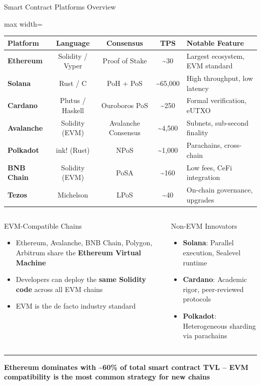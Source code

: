 \documentclass[8pt,aspectratio=169]{beamer}
\newcommand{\bottomnote}[1]{\vfill\vspace{-2mm}\textcolor{mllavender2}{\rule{\textwidth}{0.4pt}}\vspace{1mm}\footnotesize\textbf{#1}}
\begin{document}
\begin{frame}{Smart Contract Platforms Overview}
\centering
\vspace{-1mm}
\begin{adjustbox}{max width=\textwidth}
\begin{tabular}{>{\bfseries}l c c c l}
\toprule
\textbf{Platform} & \textbf{Language} & \textbf{Consensus} & \textbf{TPS} & \textbf{Notable Feature} \\
\midrule
\rowcolor{mllavender4}
Ethereum & Solidity / Vyper & Proof of Stake & \textasciitilde30 & Largest ecosystem, EVM standard \\
Solana & Rust / C & PoH + PoS & \textasciitilde65,000 & High throughput, low latency \\
\rowcolor{mllavender4}
Cardano & Plutus / Haskell & Ouroboros PoS & \textasciitilde250 & Formal verification, eUTXO \\
Avalanche & Solidity (EVM) & Avalanche Consensus & \textasciitilde4,500 & Subnets, sub-second finality \\
\rowcolor{mllavender4}
Polkadot & ink! (Rust) & NPoS & \textasciitilde1,000 & Parachains, cross-chain \\
BNB Chain & Solidity (EVM) & PoSA & \textasciitilde160 & Low fees, CeFi integration \\
\rowcolor{mllavender4}
Tezos & Michelson & LPoS & \textasciitilde40 & On-chain governance, upgrades \\
\bottomrule
\end{tabular}
\end{adjustbox}
\vspace{3mm}
\begin{columns}[T]
\begin{block}{EVM-Compatible Chains}
\footnotesize
\begin{itemize}
  \item Ethereum, Avalanche, BNB Chain, Polygon, Arbitrum share the \textbf{Ethereum Virtual Machine}
  \item Developers can deploy the \textbf{same Solidity code} across all EVM chains
  \item EVM is the de facto industry standard
\end{itemize}
\end{block}
\begin{block}{Non-EVM Innovators}
\footnotesize
\begin{itemize}
  \item \textbf{Solana}: Parallel execution, Sealevel runtime
  \item \textbf{Cardano}: Academic rigor, peer-reviewed protocols
  \item \textbf{Polkadot}: Heterogeneous sharding via parachains
\end{itemize}
\end{block}
\end{columns}
\bottomnote{Ethereum dominates with \textasciitilde60\% of total smart contract TVL -- EVM compatibility is the most common strategy for new chains}
\end{frame}
\end{document}
